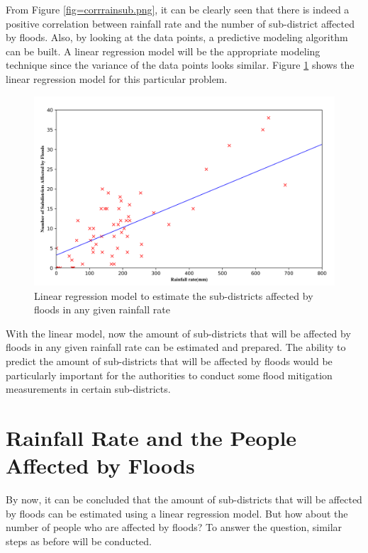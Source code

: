 \noindent
From Figure \ref{fig=corrrainsub.png}, it can be clearly seen that there is indeed a positive correlation between rainfall rate and the number of sub-district affected by floods. Also, by looking at the data points, a predictive modeling algorithm can be built. A linear regression model will be the appropriate modeling technique since the variance of the data points looks similar. Figure \ref{fig=corrrainsubreg.png} shows the linear regression model for this particular problem.\\

\begin{figure}
\begin{center}
\graphicspath{ {./Pict/} }
\includegraphics[scale=0.15]{corrrainsubreg.png}
\caption{Linear regression model to estimate the sub-districts affected by floods in any given rainfall rate}\label{fig=corrrainsubreg.png}
\end{center}
\end{figure}

\noindent
With the linear model, now the amount of sub-districts that will be affected by floods in any given rainfall rate can be estimated and prepared. The ability to predict the amount of sub-districts that will be affected by floods would be particularly important for the authorities to conduct some flood mitigation measurements in certain sub-districts.

\section{Rainfall Rate and the People Affected by Floods}
By now, it can be concluded that the amount of sub-districts that will be affected by floods can be estimated using a linear regression model. But how about the number of people who are affected by floods? To answer the question, similar steps as before will be conducted.\\

